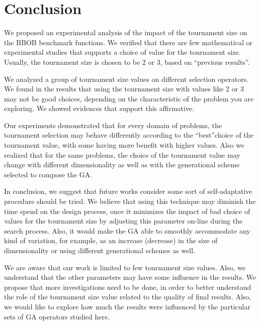 \section{Conclusion}
\label{sec:conclusion}


We proposed an experimental analysis of the impact of the tournament size on the BBOB benchmark functions. We verified that there are few mathematical or experimental studies that supports a choice of value for the tournament size. Usually, the tournament size is chosen to be 2 or 3, based on ``previous results''. 
 
We analyzed a group of tournament size values on different selection operators. We found in the results that using the tournament size with values like 2 or 3 may not be good choices, depending on the characteristic of the problem you are exploring. We showed evidences that support this affirmative. 

Our experiments demonstrated that for every domain of problems, the tournament selection may behave differently according to the ``best''choice of the tournament value, with some having more benefit with higher values. Also we realized that for the same problems, the choice of the tournament value may change with different dimensionality as well as with the generational scheme selected to compose the GA.

In conclusion, we suggest that future works consider some sort of self-adaptative procedure should be tried. We believe that using this technique may diminish the time spend on the design process, once it minimizes the impact of bad choice of values for the tournament size by adjusting this parameter on-line during the search process. Also, it would make the GA able to smoothly accommodate any kind of variation, for example, as an increase (decrease) in the size of dimensionality or using different generational schemes as well.

We are aware that our work is limited to few tournament size values. Also, we understand that the other parameters may have some influence in the results. We propose that more investigations need to be done, in order to better understand the role of the tournament size value related to the quality of final results. Also, we would like to explore how much the results were influenced by the particular sets of GA operators studied here.


